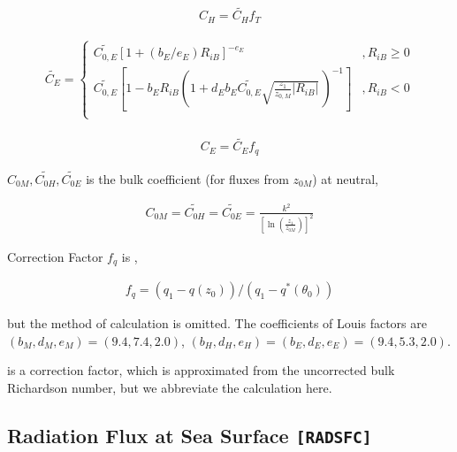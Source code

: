 \begin{eqnarray}
    C_H = \widetilde{C_H} f_T
\end{eqnarray}

\begin{eqnarray}
    \widetilde{C_E} = \left\{
      \begin{array}{lr}
      \widetilde{C_{0,E}} [ 1 + (b_E/e_E) R_{iB} ]^{-e_E}
            &,
          R_{iB} \geq 0 \\
      \widetilde{C_{0,E}} \left[ 1 - b_E R_{iB}
                                  \left( 1+ d_E b_E \widetilde{C_{0,E}}
                                  \sqrt{\frac{z_1}{z_{0,M}}| R_{iB}|} \,
                                  \right)^{-1} \right]      
          &,
          R_{iB} < 0 \\
      \end{array} \right.
\end{eqnarray}

\begin{eqnarray}
    C_E = \widetilde{C_E} f_q
\end{eqnarray}

\(C_{0M}, \widetilde{C_{0H}}, \widetilde{C_{0E}}\) is the bulk
coefficient (for fluxes from \(z_{0M}\)) at neutral,

\begin{eqnarray}
    C_{0M}  =  \widetilde{C_{0H}}  =  \widetilde{C_{0E}}  =
       \frac{k^2}{\left[\ln \left(\frac{z_1}{z_{0M}}\right)\right]^2 }
\end{eqnarray}

Correction Factor \(f_q\) is ,

\begin{eqnarray}
  f_q = (q_1 - q(z_0))/(q_1 - q^{\ast}(\theta_0))
\end{eqnarray}

but the method of calculation is omitted. The coefficients of Louis
factors are \(( b_M, d_M, e_M ) = ( 9.4, 7.4, 2.0 )\),
\(( b_H, d_H, e_H ) = ( b_E, d_E, e_E ) = ( 9.4, 5.3, 2.0 )\).

is a correction factor, which is approximated from the uncorrected bulk
Richardson number, but we abbreviate the calculation here.

\hypertarget{radiation-flux-at-sea-surface-radsfc}{%
\subsection{\texorpdfstring{Radiation Flux at Sea Surface
\texttt{{[}RADSFC{]}}}{Radiation Flux at Sea Surface {[}RADSFC{]}}}\label{radiation-flux-at-sea-surface-radsfc}}


